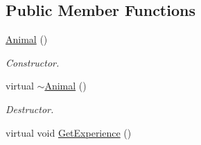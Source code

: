 \subsection*{Public Member Functions}
\begin{DoxyCompactItemize}
\item 
\hyperlink{class_animal_a1e726a49ec952443190ac62dad22353c}{Animal} ()\hypertarget{class_animal_a1e726a49ec952443190ac62dad22353c}{}\label{class_animal_a1e726a49ec952443190ac62dad22353c}

\begin{DoxyCompactList}\small\item\em Constructor. \end{DoxyCompactList}\item 
virtual \hyperlink{class_animal_a476af25adde5f0dfa688129c8f86fa5c}{$\sim$\+Animal} ()\hypertarget{class_animal_a476af25adde5f0dfa688129c8f86fa5c}{}\label{class_animal_a476af25adde5f0dfa688129c8f86fa5c}

\begin{DoxyCompactList}\small\item\em Destructor. \end{DoxyCompactList}\item 
virtual void \hyperlink{class_animal_aa8f3017b9c7e36e0a43a0846eff27e9b}{Get\+Experience} ()\hypertarget{class_animal_aa8f3017b9c7e36e0a43a0846eff27e9b}{}\label{class_animal_aa8f3017b9c7e36e0a43a0846eff27e9b}


\end{DoxyCompactItemize}
